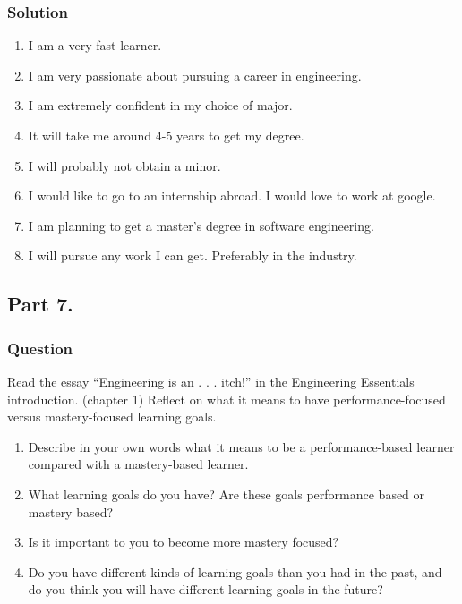 \documentclass[a4paper, 10pt]{article}
\begin{document}
		\subsubsection{Solution}
			\begin{enumerate}[label=\alph*)]
				\item I am a very fast learner.
				\item I am very passionate about pursuing a career in engineering.
				\item I am extremely confident in my choice of major.
				\item It will take me around 4-5 years to get my degree.
				\item I will probably not obtain a minor.
				\item I would like to go to an internship abroad. I would love to work at google.
				\item I am planning to get a master's degree in software engineering.
				\item I will pursue any work I can get. Preferably in the industry.
			\end{enumerate}
		
		\subsection{Part 7.}
			\subsubsection{Question}
				\noindent Read the essay “Engineering is an . . . itch!” in the Engineering Essentials introduction. (chapter 1) Reflect on what it means to have performance-focused versus mastery-focused learning goals.
				\begin{enumerate}[label=\alph*)]
					\item Describe in your own words what it means to be a performance-based learner compared with a mastery-based learner.
					\item What learning goals do you have? Are these goals performance based or mastery based?
					\item Is it important to you to become more mastery focused?
					\item Do you have different kinds of learning goals than you had in the past, and do you think you will have different learning goals in the future?
				\end{enumerate}
\end{document}
